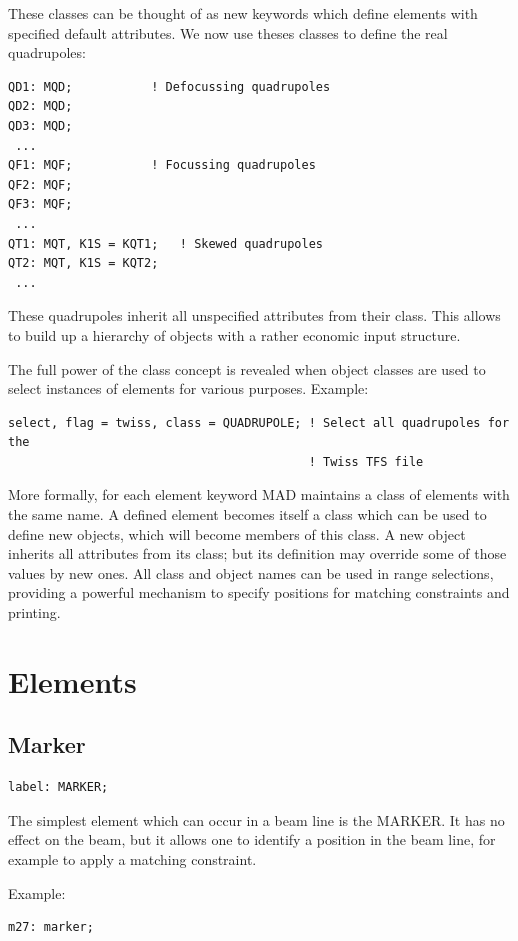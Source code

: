 These classes can be thought of as new keywords which define elements
with specified default attributes. We now use theses classes to define
the real quadrupoles:  
\begin{verbatim}
QD1: MQD;           ! Defocussing quadrupoles
QD2: MQD;
QD3: MQD;
 ...
QF1: MQF;           ! Focussing quadrupoles
QF2: MQF;
QF3: MQF;
 ...
QT1: MQT, K1S = KQT1;   ! Skewed quadrupoles
QT2: MQT, K1S = KQT2;
 ...
\end{verbatim} 

These quadrupoles inherit all unspecified attributes from their
class. This allows to build up a hierarchy of objects with a rather
economic input structure.  

The full power of the class concept is revealed when object classes are
used to select instances of elements for various purposes. Example:  
\begin{verbatim}
select, flag = twiss, class = QUADRUPOLE; ! Select all quadrupoles for the
                                          ! Twiss TFS file
\end{verbatim}

More formally, for each element keyword MAD maintains a class of
elements with the same name. A defined element becomes itself a class
which can be used to define new objects, which will become members of
this class. A new object inherits all attributes from its class; but its
definition may override some of those values by new ones. All class and
object names can be used in range selections, providing a powerful
mechanism to specify positions for matching constraints and printing.  

\section{Elements}

%
\subsection{Marker}
\label{sec:marker}

\begin{verbatim}
label: MARKER;
\end{verbatim} 
The simplest element which can occur in a beam line is the MARKER. It
has no effect on the beam, but it allows one to identify a position in
the beam line, for example to apply a matching constraint.  

Example: 
\begin{verbatim}
m27: marker;
\end{verbatim}


